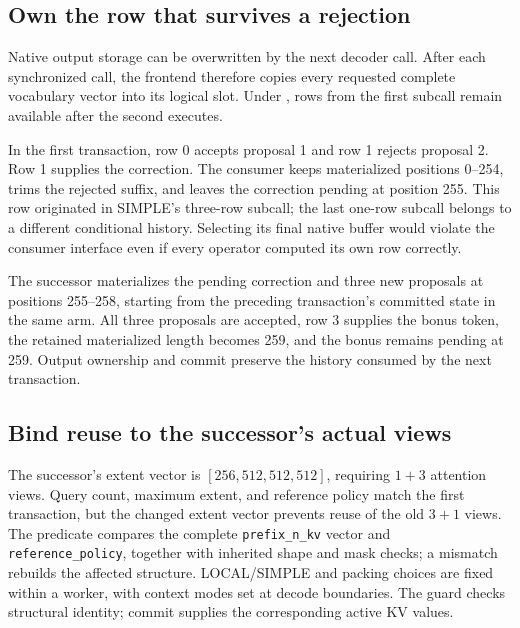 \subsection{Own the row that survives a rejection}
Native output storage can be overwritten by the next decoder call. After each synchronized call, the frontend therefore copies every requested complete vocabulary vector into its logical slot. Under \Simple{}, rows from the first subcall remain available after the second executes.

In the first transaction, row 0 accepts proposal 1 and row 1 rejects proposal 2. Row 1 supplies the correction. The consumer keeps materialized positions 0--254, trims the rejected suffix, and leaves the correction pending at position 255. This row originated in SIMPLE's three-row subcall; the last one-row subcall belongs to a different conditional history. Selecting its final native buffer would violate the consumer interface even if every operator computed its own row correctly.

The successor materializes the pending correction and three new proposals at positions 255--258, starting from the preceding transaction's committed state in the same arm. All three proposals are accepted, row 3 supplies the bonus token, the retained materialized length becomes 259, and the bonus remains pending at 259. Output ownership and commit preserve the history consumed by the next transaction.

\subsection{Bind reuse to the successor's actual views}
The successor's extent vector is $[256,512,512,512]$, requiring $1+3$ attention views. Query count, maximum extent, and reference policy match the first transaction, but the changed extent vector prevents reuse of the old $3+1$ views. The predicate compares the complete \texttt{prefix\_n\_kv} vector and \texttt{reference\_policy}, together with inherited shape and mask checks; a mismatch rebuilds the affected structure. LOCAL/SIMPLE and packing choices are fixed within a worker, with context modes set at decode boundaries. The guard checks structural identity; commit supplies the corresponding active KV values.

